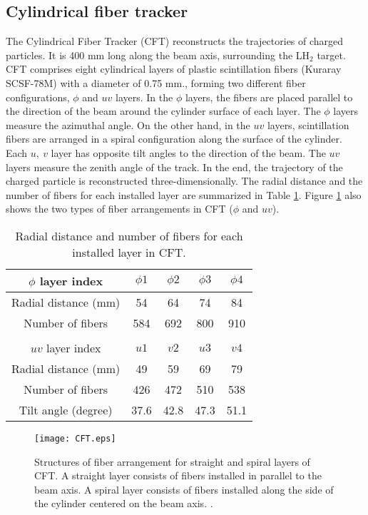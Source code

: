 \subsection{Cylindrical fiber tracker}
The Cylindrical Fiber Tracker (CFT) reconstructs the trajectories of charged particles. It is 400 mm long along the beam axis, surrounding the LH$_2$ target. CFT comprises eight cylindrical layers of plastic scintillation fibers (Kuraray SCSF-78M) with a diameter of 0.75 mm., forming two different fiber configurations, $\phi$ and $uv$ layers. In the $\phi$ layers, the fibers are placed parallel to the direction of the beam around the cylinder surface of each layer. The $\phi$ layers measure the azimuthal angle. On the other hand, in the $uv$ layers, scintillation fibers are arranged in a spiral configuration along the surface of the cylinder. Each $u,\ v$ layer has opposite tilt angles to the direction of the beam. The $uv$ layers measure the zenith angle of the track. In the end, the trajectory of the charged particle is reconstructed three-dimensionally. 
The radial distance and the number of fibers for each installed layer are summarized in Table \ref{tab-CFT}.
Figure \ref{fig-CFT} also shows the two types of fiber arrangements in CFT ($\phi$ and $uv$).

\begin{table}[h]
  \begin{center}
    \caption{Radial distance and number of fibers for each installed layer in CFT.}
    \begin{tabular}{ccccc} \hline \hline
      $\phi$ layer index & $\phi1$ & $\phi2$ & $\phi3$ & $\phi4$ \\ \hline
      Radial distance (mm) & 54 & 64 & 74 & 84 \\
      Number of fibers & 584 & 692 & 800 & 910 \\ \hline\hline
      \\
      \hline \hline
      $uv$ layer index & $u1$ & $v2$ & $u3$ & $v4$ \\ \hline
      Radial distance (mm) & 49 & 59 & 69 & 79 \\
      Number of fibers & 426 & 472 & 510 & 538 \\ 
      Tilt angle (degree) & 37.6 & 42.8 & 47.3 & 51.1 \\
      \hline\hline
   \end{tabular}
   \label{tab-CFT}
   \end{center}
\end{table}

\begin{figure}[!h]
 \begin{center}
   \texttt{[image: CFT.eps]}
   \caption{Structures of fiber arrangement for straight and spiral layers of CFT. A straight layer consists of fibers installed in parallel to the beam axis. A spiral layer consists of fibers installed along the side of the cylinder centered on the beam axis. \cite{Aka-2020}.}
   \label{fig-CFT}
 \end{center}
\end{figure}

